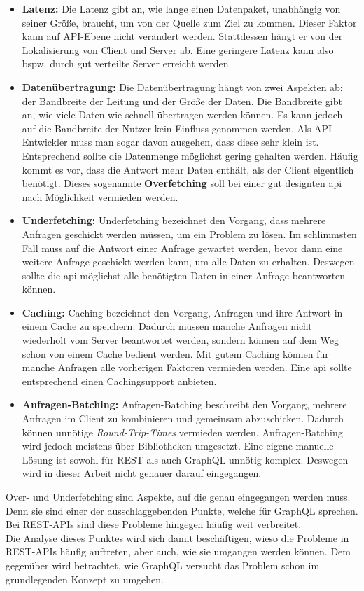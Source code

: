 \begin{itemize}
\item \textbf{Latenz:} Die Latenz gibt an, wie lange einen Datenpaket, unabhängig von seiner Größe, braucht, um von der Quelle zum Ziel zu kommen. Dieser Faktor kann auf API-Ebene nicht verändert werden. Stattdessen hängt er von der Lokalisierung von Client und Server ab. Eine geringere Latenz kann also bspw. durch gut verteilte Server erreicht werden.
\item \textbf{Datenübertragung:} Die Datenübertragung hängt von zwei Aspekten ab: der Bandbreite der Leitung und der Größe der Daten. Die Bandbreite gibt an, wie viele Daten wie schnell übertragen werden können. Es kann jedoch auf die Bandbreite der Nutzer kein Einfluss genommen werden. Als API-Entwickler muss man sogar davon ausgehen, dass diese sehr klein ist. Entsprechend sollte die Datenmenge möglichst gering gehalten werden. Häufig kommt es vor, dass die Antwort mehr Daten enthält, als der Client eigentlich benötigt. Dieses sogenannte \textbf{Overfetching} soll bei einer gut designten \ac{api} nach Möglichkeit vermieden werden.
\item \textbf{Underfetching:} Underfetching bezeichnet den Vorgang, dass mehrere Anfragen geschickt werden müssen, um ein Problem zu lösen. Im schlimmsten Fall muss auf die Antwort einer Anfrage gewartet werden, bevor dann eine weitere Anfrage geschickt werden kann, um alle Daten zu erhalten. Deswegen sollte die \ac{api} möglichst alle benötigten Daten in einer Anfrage beantworten können.
\item \textbf{Caching:} Caching bezeichnet den Vorgang, Anfragen und ihre Antwort in einem Cache zu speichern. Dadurch müssen manche Anfragen nicht wiederholt vom Server beantwortet werden, sondern können auf dem Weg schon von einem Cache bedient werden. Mit gutem Caching können für manche Anfragen alle vorherigen Faktoren vermieden werden. Eine \ac{api} sollte entsprechend einen Caching\-support anbieten.
\item \textbf{Anfragen-Batching:} Anfragen-Batching beschreibt den Vorgang, mehrere Anfragen im Client zu kombinieren und gemeinsam abzuschicken. Dadurch können unnötige \textit{Round-Trip-Times} vermieden werden. Anfragen-Batching wird jedoch meistens über Bibliotheken umgesetzt. Eine eigene manuelle Lösung ist sowohl für \ac{REST} als auch GraphQL unnötig komplex. Deswegen wird in dieser Arbeit nicht genauer darauf eingegangen.
\end{itemize}

Over- und Underfetching sind Aspekte, auf die genau eingegangen werden muss. Denn sie sind einer der ausschlaggebenden Punkte, welche für GraphQL sprechen. Bei REST-APIs sind diese Probleme hingegen häufig weit verbreitet.\\
Die Analyse dieses Punktes wird sich damit beschäftigen, wieso die Probleme in REST-APIs häufig auftreten, aber auch, wie sie umgangen werden können. Dem gegenüber wird betrachtet, wie GraphQL versucht  das Problem schon im grundlegenden Konzept zu umgehen.\\

